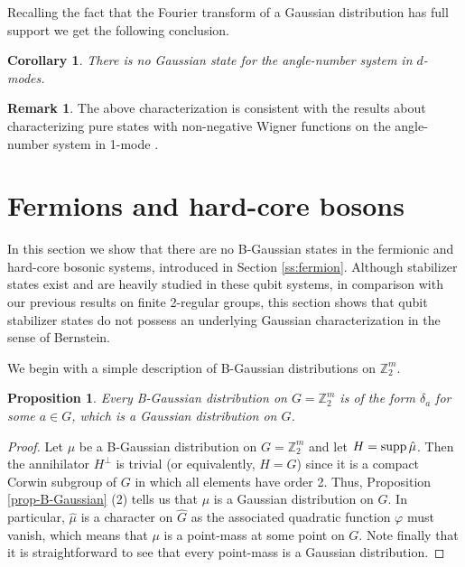 \documentclass[12pt,reqno]{amsart}
\newtheorem{cor}[thm]{Corollary}
\newtheorem{prop}[thm]{Proposition}
\theoremstyle{definition}
\theoremstyle{definition}
\theoremstyle{definition}
\newtheorem{rem}[thm]{Remark}
\numberwithin{thm}{section}
\numberwithin{equation}{section}
\newcommand{\z}{\mathbb{Z}}
\begin{document}
Recalling the fact that the Fourier transform of a Gaussian distribution has full support we get the following conclusion.

\begin{cor}\label{c:angle-number-nongauss}
    There is no Gaussian state for the angle-number system in $d$-modes.
\end{cor}


\begin{rem}
The above characterization is consistent with the results about characterizing pure states with non-negative Wigner functions on the angle-number system in 1-mode \cite{rigas2010non}.
\end{rem}




\section{Fermions and hard-core bosons}\label{sec-second-ex}

In this section we show that there are no B-Gaussian states in the fermionic and hard-core bosonic systems, introduced in Section \ref{ss:fermion}. Although stabilizer states exist and are heavily studied in these qubit systems, in comparison with our previous results on finite 2-regular groups, this section shows that qubit stabilizer states do not possess an underlying Gaussian characterization in the sense of Bernstein.

We begin with a simple description of B-Gaussian distributions on $\z_2^m$.



\begin{prop} \label{prop-qubit-Gaussian}
Every B-Gaussian distribution on $G=\z_2^{m}$ is of the form $\delta_a$ for some $a\in G$, which is a Gaussian distribution on $G$.
\end{prop}

\begin{proof}
    Let $\mu$ be a B-Gaussian distribution on $G=\z_2^{m}$ and let $H={\rm supp}\,\hat{\mu}$. Then the annihilator $H^\perp$ is trivial (or equivalently, $H=G$) since it is a compact Corwin subgroup of $G$ in which all elements have order 2. Thus, Proposition \ref{prop-B-Gaussian} (2) tells us that $\mu$ is a Gaussian distribution on $G$. In particular, $\hat{\mu}$ is a character on $\widehat{G}$ as the associated quadratic function $\varphi$ must vanish, which means that $\mu$ is a point-mass at some point on $G$. Note finally that it is straightforward to see that every point-mass is a Gaussian distribution.

\end{proof}
\end{document}
